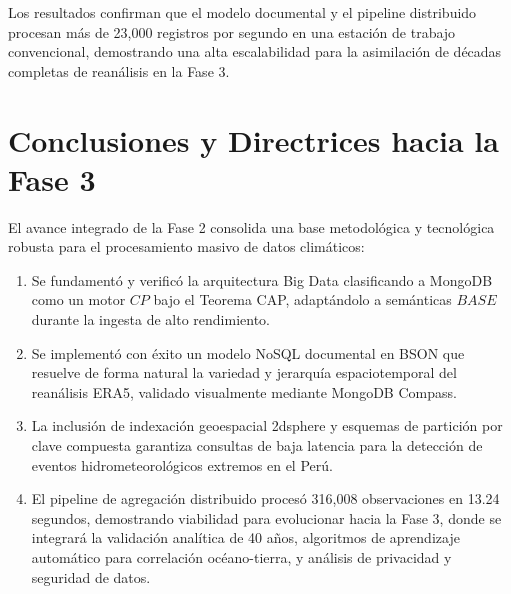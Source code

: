 \documentclass[conference]{IEEEtran}
\begin{document}
Los resultados confirman que el modelo documental y el pipeline distribuido procesan más de 23,000 registros por segundo en una estación de trabajo convencional, demostrando una alta escalabilidad para la asimilación de décadas completas de reanálisis en la Fase 3.

\section{Conclusiones y Directrices hacia la Fase 3}

El avance integrado de la Fase 2 consolida una base metodológica y tecnológica robusta para el procesamiento masivo de datos climáticos:
\begin{enumerate}
    \item Se fundamentó y verificó la arquitectura Big Data clasificando a MongoDB como un motor $CP$ bajo el Teorema CAP, adaptándolo a semánticas $BASE$ durante la ingesta de alto rendimiento.
    \item Se implementó con éxito un modelo NoSQL documental en BSON que resuelve de forma natural la variedad y jerarquía espaciotemporal del reanálisis ERA5, validado visualmente mediante MongoDB Compass.
    \item La inclusión de indexación geoespacial 2dsphere y esquemas de partición por clave compuesta garantiza consultas de baja latencia para la detección de eventos hidrometeorológicos extremos en el Perú.
    \item El pipeline de agregación distribuido procesó 316,008 observaciones en 13.24 segundos, demostrando viabilidad para evolucionar hacia la Fase 3, donde se integrará la validación analítica de 40 años, algoritmos de aprendizaje automático para correlación océano-tierra, y análisis de privacidad y seguridad de datos.
\end{enumerate}



\end{document}
